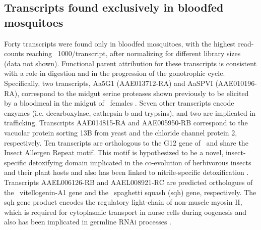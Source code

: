 \subsection{Transcripts found exclusively in bloodfed mosquitoes}
Forty transcripts were found only in bloodfed mosquitoes, with the highest read-counts reaching ~1000/transcript, after normalizing for different library sizes (data not shown). Functional parent attribution for these transcripts is consistent with a role in digestion and in the progression of the gonotrophic cycle. Specifically, two transcripts, Aa5G1 (AAE013712-RA) and AaSPVI (AAE010196-RA), correspond to the midgut serine proteases shown previously to be elicited by a bloodmeal in the midgut of \Aa\  females \cite{Brackney2010}. Seven other transcripts encode enzymes (i.e. decarboxylase, cathepsin b and trypsins), and two are implicated in trafficking. Transcripts AAE014815-RA and AAE005950-RB correspond to the vacuolar protein sorting 13B from yeast and the chloride channel protein 2, respectively. Ten transcripts are orthologous to the G12 gene of \Ag\ and share the Insect Allergen Repeat motif. This motif is hypothesized to be a novel, insect-specific detoxifying domain implicated in the co-evolution of herbivorous insects and their plant hosts and also has been linked to nitrile-specific detoxification \cite{Fischer2008}. Transcripts AAEL006126-RB and AAEL008921-RC are predicted orthologues of the \Cxq\ vitellogenin-A1 gene and the \Dmel\ spaghetti squash (sqh) gene, respectively. The sqh gene product encodes the regulatory light-chain of non-muscle myosin II, which is required for cytoplasmic transport in nurse cells during oogenesis and also has been implicated in germline \gls{RNAi} processes \cite{Pane2007}.

